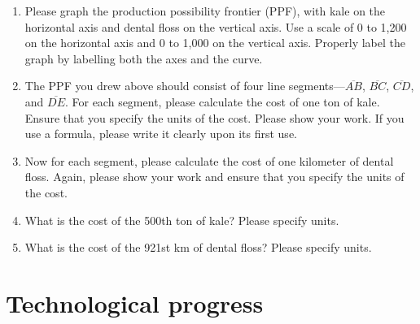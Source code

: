 \documentclass[
    letterpaper,paper=portrait,fleqn,
    DIV=16,fontsize=12pt,twoside=semi,
    parskip=full-,
    headings=standardclasses]
{scrartcl}
\begin{document}
\begin{enumerate}

\item Please graph the production possibility frontier (PPF), with kale on the horizontal axis and dental floss on the vertical axis. Use a scale of 0 to 1,200 on the horizontal axis and 0 to 1,000 on the vertical axis. Properly label the graph by labelling both the axes and the curve.

\vspace{12pt}
\begin{center}
\end{center}
\vspace{24pt}

\item The PPF you drew above should consist of four line segments---$\overline{AB}$, $\overline{BC}$, $\overline{CD}$, and $\overline{DE}$. For each segment, please calculate the cost of one ton of kale. Ensure that you specify the units of the cost. Please show your work. If you use a formula, please write it clearly upon its first use.

\clearpage

\item Now for each segment, please calculate the cost of one kilometer of dental floss. Again, please show your work and ensure that you specify the units of the cost.

\vfill

\item What is the cost of the 500th ton of kale? Please specify units.

\vspace{5\baselineskip}

\item What is the cost of the 921st km of dental floss? Please specify units.

\vspace{5\baselineskip}

\end{enumerate}

\clearpage

\section{Technological progress}
\end{document}
